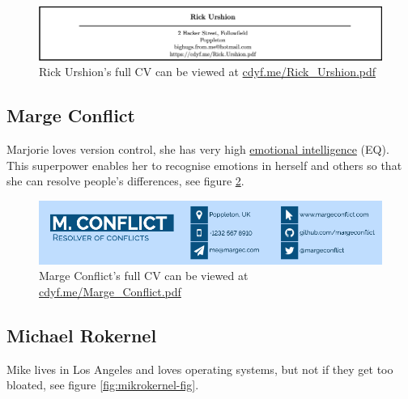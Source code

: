 \documentclass[
]{book}
\begin{document}
\begin{figure}

{\centering \includegraphics[width=1\linewidth]{images/rick_urshion} 

}

\caption{Rick Urshion's full CV can be viewed at \href{https://www.cdyf.me/Rick_Urshion.pdf}{cdyf.me/Rick\_Urshion.pdf}}\label{fig:rickurshion-fig}
\end{figure}



\hypertarget{marge-conflict}{%
\subsection{Marge Conflict}\label{marge-conflict}}

Marjorie loves version control, she has very high \href{https://en.wikipedia.org/wiki/Emotional_intelligence}{emotional intelligence} (EQ). This superpower enables her to recognise emotions in herself and others so that she can resolve people's differences, see figure \ref{fig:margeconflict-fig}.

\begin{figure}

{\centering \includegraphics[width=1\linewidth]{images/marge_conflict} 

}

\caption{Marge Conflict's full CV can be viewed at \href{https://www.cdyf.me/Marge_Conflict.pdf}{cdyf.me/Marge\_Conflict.pdf}}\label{fig:margeconflict-fig}
\end{figure}



\hypertarget{mike-rokernel}{%
\subsection{Michael Rokernel}\label{mike-rokernel}}

Mike lives in Los Angeles and loves operating systems, but not if they get too bloated, see figure \ref{fig:mikrokernel-fig}.
\end{document}
